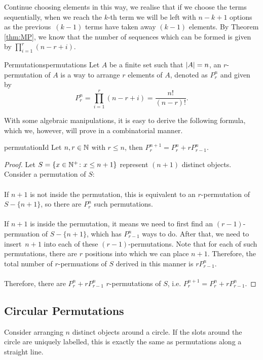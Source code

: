 \documentclass[math]{amznotes}
\theoremstyle{remark}
\begin{document}
Continue choosing elements in this way, we realise that if we choose the terms sequentially, when we reach the $k$-th term we will be left with $n - k + 1$ options as the previous~$(k - 1)$ terms have taken away $(k - 1)$ elements. By Theorem \ref{thm:MP}, we know that the number of sequences which can be formed is given by $\prod_{i = 1}^{r}(n - r + i)$.
\begin{dfnbox}{Permutations}{permutations}
    Let $A$ be a finite set such that ${\left\lvert {A} \right\rvert} = n$, an $r$-permutation of $A$ is a way to arrange $r$ elements of $A$, denoted as $P^n_r$ and given by
    \begin{equation*}
        P^n_r = \prod_{i = 1}^{r}(n - r + i) = \frac{n!}{(n - r)!}.
    \end{equation*}
\end{dfnbox}
With some algebraic manipulations, it is easy to derive the following formula, which we, however, will prove in a combinatorial manner.
\begin{thmbox}{}{permutationId}
    Let $n, r \in \mathbb{N}$ with $r \leq n$, then $P^{n + 1}_r = P^n_r + rP^n_{r - 1}$.
    \tcblower
    \begin{proof}
        Let $S = \left\{x \in \mathbb{N}^+ \colon x \leq n + 1\right\}$ represent $(n + 1)$ distinct objects. Consider a permutation of $S$:
        \\\\
        If $n + 1$ is not inside the permutation, this is equivalent to an $r$-permutation of~$S - \{n + 1\}$, so there are $P^n_r$ such permutations.
        \\\\
    If $n + 1$ is inside the permutation, it means we need to first find an $(r - 1)$-permuation of $S - \{n + 1\}$, which has $P^n_{r - 1}$ ways to do. After that, we need to insert~$n + 1$ into each of these $(r - 1)$-permutations. Note that for each of such permutations, there are $r$ positions into which we can place $n + 1$. Therefore, the total number of $r$-permuations of $S$ derived in this manner is $rP^n_{r - 1}$.
        \\\\
        Therefore, there are $P^n_{r} + rP^n_{r - 1}$ $r$-permutations of $S$, i.e. $P^{n + 1}_r = P^n_r + rP^n_{r - 1}$. 
    \end{proof}
\end{thmbox}
\subsection{Circular Permutations}
Consider arranging $n$ distinct objects around a circle. If the slots around the circle are uniquely labelled, this is exactly the same as permutations along a straight line.
\end{document}
